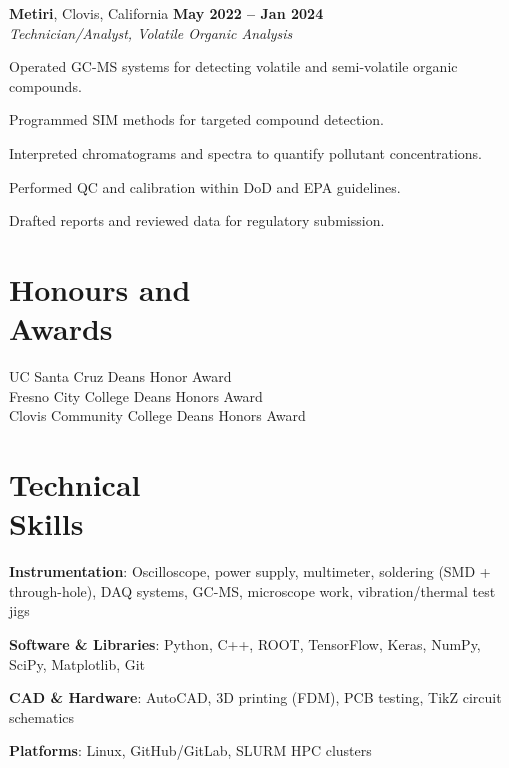 \documentclass[margin,line]{resume}
\let\origsection\section%
\let\section\subsection%
\let\section\origsection%
\begin{document}
\begin{resume}
\textbf{Metiri}, Clovis, California \hfill \textbf{May 2022 -- Jan 2024}\\
\textsl{Technician/Analyst, Volatile Organic Analysis}
\begin{list2}
\item Operated GC-MS systems for detecting volatile and semi-volatile organic compounds.
\item Programmed SIM methods for targeted compound detection.
\item Interpreted chromatograms and spectra to quantify pollutant concentrations.
\item Performed QC and calibration within DoD and EPA guidelines.
\item Drafted reports and reviewed data for regulatory submission.
\end{list2}


\section{\mysidestyle Honours and\\Awards}

UC Santa Cruz Deans Honor Award\\
Fresno City College Deans Honors Award\\
Clovis Community College Deans Honors Award\\



\section{\mysidestyle Technical \\Skills}
\textbf{Instrumentation}: Oscilloscope, power supply, multimeter, soldering (SMD + through-hole), DAQ systems, GC-MS, microscope work, vibration/thermal test jigs

\textbf{Software \& Libraries}: Python, C++, ROOT, TensorFlow, Keras, NumPy, SciPy, Matplotlib, Git

\textbf{CAD \& Hardware}: AutoCAD, 3D printing (FDM), PCB testing, TikZ circuit schematics

\textbf{Platforms}: Linux, GitHub/GitLab, SLURM HPC clusters

\end{resume}
\end{document}
